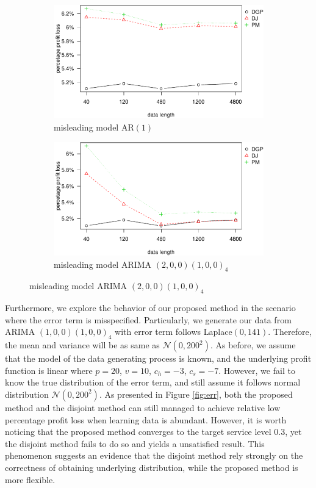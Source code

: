 \documentclass{article}
\begin{document}
\begin{figure}[ht]
\centering
\caption{Percentage profit loss vs. data size in misleading model}
\begin{subfigure}[b]{0.48\textwidth}
\centering
\includegraphics[width=\textwidth]{information-plot_files/figure-latex/AR(1)-1.pdf}
\caption{misleading model AR$(1)$}
\end{subfigure}
\hfill
\begin{subfigure}[b]{0.48\textwidth}
\centering
\includegraphics[width=\textwidth]{information-plot_files/figure-latex/SAR(3)(1)_4-1.pdf}
\caption{misleading model ARIMA $(2,0,0)(1,0,0)_4$}
\end{subfigure}
\label{fig:mis}
\end{figure}

Furthermore, we explore the behavior of our proposed method in the scenario where the error term is misspecified. Particularly, we generate our data from ARIMA $(1,0,0)(1,0,0)_4$ with error term follows Laplace$(0,141)$. Therefore, the mean and variance will be as same as $\mathcal{N}(0,200^2)$. As before, we assume that the model of the data generating process is known, and the underlying profit function is linear where $p=20$, $v=10$, $c_h=-3$, $c_s=-7$. However, we fail to know the true distribution of the error term, and still assume it follows normal distribution $\mathcal{N}(0,200^2)$. As presented in Figure \ref{fig:err}, both the proposed method and the disjoint method can still managed to achieve relative low percentage profit loss when learning data is abundant. However, it is worth noticing that the proposed method converges to the target service level 0.3, yet the disjoint method fails to do so and yields a unsatisfied result. This phenomenon suggests an evidence that the disjoint method rely strongly on the correctness of obtaining underlying distribution, while the proposed method is more flexible. 
\end{document}
